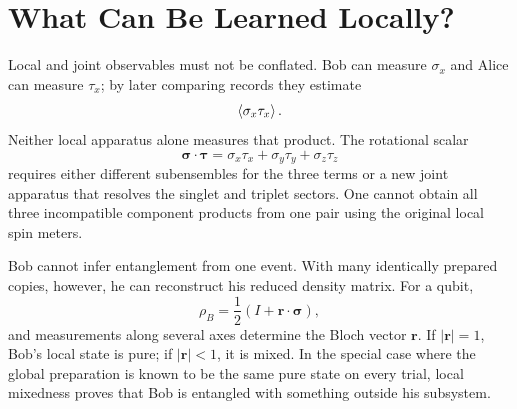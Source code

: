 \begin{classroomqa}
\end{classroomqa}

\section{What Can Be Learned Locally?}

Local and joint observables must not be conflated. Bob can measure \(\sigma_x\) and Alice can measure \(\tau_x\); by later comparing records they estimate
\begin{equation}
\left\langle\sigma_x\tau_x\right\rangle.
\end{equation}
Neither local apparatus alone measures that product. The rotational scalar
\begin{equation}
\boldsymbol{\sigma}\cdot\boldsymbol{\tau}
=\sigma_x\tau_x+\sigma_y\tau_y+\sigma_z\tau_z
\end{equation}
requires either different subensembles for the three terms or a new joint apparatus that resolves the singlet and triplet sectors. One cannot obtain all three incompatible component products from one pair using the original local spin meters.

\begin{classroomqa}
\end{classroomqa}

Bob cannot infer entanglement from one event. With many identically prepared copies, however, he can reconstruct his reduced density matrix. For a qubit,
\begin{equation}
\rho_B
=\frac12\left(
I+\mathbf r\cdot\boldsymbol{\sigma}
\right),
\label{eq:l7-bloch-density}
\end{equation}
and measurements along several axes determine the Bloch vector \(\mathbf r\). If \(|\mathbf r|=1\), Bob's local state is pure; if \(|\mathbf r|<1\), it is mixed. In the special case where the global preparation is known to be the same pure state on every trial, local mixedness proves that Bob is entangled with something outside his subsystem.


